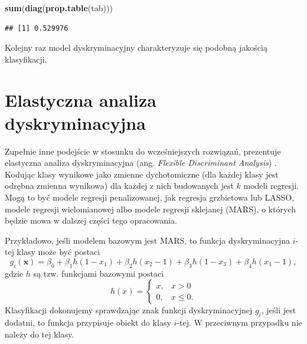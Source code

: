 \documentclass[]{book}
\newenvironment{Shaded}{\begin{snugshade}}{\end{snugshade}}
\newcommand{\KeywordTok}[1]{\textcolor[rgb]{0.13,0.29,0.53}{\textbf{#1}}}
\newcommand{\NormalTok}[1]{#1}
\theoremstyle{plain}
\theoremstyle{definition}
\theoremstyle{definition}
\theoremstyle{definition}
\theoremstyle{definition}
\theoremstyle{remark}
\begin{document}
\begin{Shaded}
\begin{Highlighting}[]
\KeywordTok{sum}\NormalTok{(}\KeywordTok{diag}\NormalTok{(}\KeywordTok{prop.table}\NormalTok{(tab)))}
\end{Highlighting}
\end{Shaded}

\begin{verbatim}
## [1] 0.529976
\end{verbatim}

Kolejny raz model dyskryminacyjny charakteryzuje się podobną jakością klasyfikacji.

\hypertarget{elastyczna-analiza-dyskryminacyjna}{%
\section{Elastyczna analiza dyskryminacyjna}\label{elastyczna-analiza-dyskryminacyjna}}

Zupełnie inne podejście w stosunku do wcześniejszych rozwiązań, prezentuje elastyczna analiza dyskryminacyjna (ang. \emph{Flexible Discriminant Analysis}) . Kodując klasy wynikowe jako zmienne dychotomiczne (dla każdej klasy jest odrębna zmienna wynikowa) dla każdej z nich budowanych jest \(k\) modeli regresji. Mogą to być modele regresji penalizowanej, jak regresja grzbietowa lub LASSO, modele regresji wielomianowej albo modele regresji sklejanej (MARS), o których będzie mowa w dalszej części tego opracowania.

Przykładowo, jeśli modelem bazowym jest MARS, to funkcja dyskryminacyjna \(i\)-tej klasy może być postaci
\begin{equation}
    g_i(\boldsymbol x)=\beta_0+\beta_1h(1-x_1)+\beta_2h(x_2-1)+\beta_3h(1-x_3)+\beta_4h(x_1-1),
\end{equation}
gdzie \(h\) są tzw. funkcjami bazowymi postaci
\begin{equation}
    h(x)= \begin{cases}
        x, & x> 0\\
        0, & x\leq 0.
    \end{cases}
\end{equation}
Klasyfikacji dokonujemy sprawdzając znak funkcji dyskryminacyjnej \(g_i\), jeśli jest dodatni, to funkcja przypisuje obiekt do klasy \(i\)-tej. W przeciwnym przypadku nie należy do tej klasy.
\end{document}
